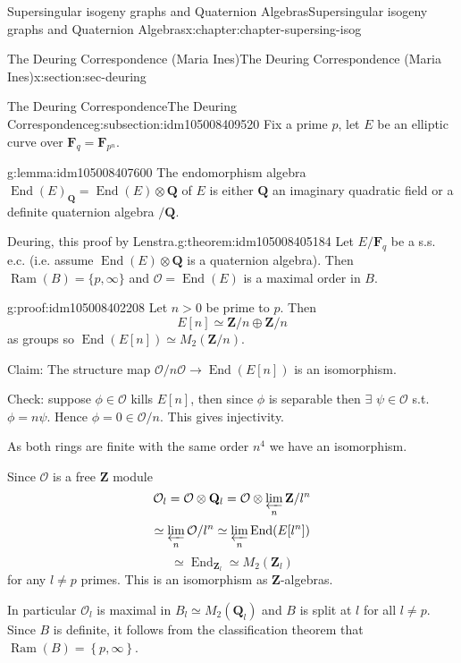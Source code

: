 \documentclass[oneside,10pt,]{book}
\numberwithin{equation}{section}
\newcommand{\lb}{[}
\newcommand{\rb}{]}
\newcommand{\ZZ}{\mathbf{Z}}
\newcommand{\QQ}{\mathbf{Q}}
\newcommand{\FF}{\mathbf{F}}
\newcommand{\ints}{\mathcal{O}}
\DeclareMathOperator{\End}{End}
\newcommand{\gt}{>}
\begin{document}
\begin{chapterptx}{Supersingular isogeny graphs and Quaternion Algebras}{}{Supersingular isogeny graphs and Quaternion Algebras}{}{}{x:chapter:chapter-supersing-isog}
\begin{sectionptx}{The Deuring Correspondence (Maria Ines)}{}{The Deuring Correspondence (Maria Ines)}{}{}{x:section:sec-deuring}
\typeout{************************************************}
%
\begin{subsectionptx}{The Deuring Correspondence}{}{The Deuring Correspondence}{}{}{g:subsection:idm105008409520}
Fix a prime \(p\), let \(E\) be an elliptic curve over \(\FF_q = \FF_{p^n}\).%
\begin{lemma}{}{}{g:lemma:idm105008407600}%
The endomorphism algebra  \(\End(E)_\QQ = \End(E) \otimes \QQ\) of \(E\) is either \(\QQ\) an imaginary quadratic field or a definite quaternion algebra \(/\QQ\).%
\end{lemma}
\begin{theorem}{Deuring, this proof by Lenstra.}{}{g:theorem:idm105008405184}%
Let \(E/\FF_q\) be a s.s. e.c. (i.e. assume \(\End(E) \otimes \QQ\) is a quaternion algebra). Then \(\operatorname{Ram}(B)  =    \{p, \infty\}\) and \(\ints = \End(E) \) is a maximal order in \(B\).%
\end{theorem}
\begin{proofptx}{}{g:proof:idm105008402208}
Let \(n \gt 0\)  be prime to \(p \). Then%
\begin{equation*}
E \lb n \rb  \simeq \ZZ/ n \oplus \ZZ/n
\end{equation*}
as groups so \(\End(E\lb n\rb ) \simeq M_2(\ZZ/n)\).%
\par
Claim: The structure map \(\ints/n\ints  \to \End(E\lb n \rb)\) is an isomorphism.%
\par
Check: suppose \(\phi \in  \ints\) kills \(E\lb n \rb\), then since \(\phi\) is separable then \(\exists\) \(\psi \in \ints\) s.t. \(\phi = n \psi\). Hence \(\phi = 0 \in \ints/n\). This gives injectivity.%
\par
As both rings are finite with the same order \(n^4\) we have an isomorphism.%
\par
Since \(\ints\) is a free \(\ZZ\) module%
\begin{equation*}
\ints_l = \ints \otimes \QQ_l = \ints \otimes \varprojlim _n \ZZ/l^n
\end{equation*}
%
\begin{equation*}
\simeq \varprojlim_n \ints/l^n \simeq \varprojlim_n \End(E[l^n])
\end{equation*}
%
\begin{equation*}
\simeq \End_{\ZZ_l}  \simeq M_2( \ZZ_l)
\end{equation*}
for any \(l \ne p\) primes. This is an isomorphism as \(\ZZ\)-algebras.%
\par
In particular \(\ints_l\) is maximal in \(B_l \simeq M_2(\QQ_l)\) and \(B\) is split at \(l\) for all \(l\ne p\). Since \(B\) is definite, it follows from the classification theorem that \(\operatorname{Ram}(B)  = \left\{ p, \infty \right\}\).%

\end{proofptx}
\end{subsectionptx}
\end{sectionptx}
\end{chapterptx}
\end{document}
